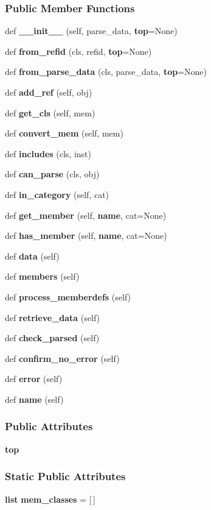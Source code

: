\subsubsection*{Public Member Functions}
\begin{DoxyCompactItemize}
\item 
def {\bf \+\_\+\+\_\+init\+\_\+\+\_\+} (self, parse\+\_\+data, {\bf top}=None)
\item 
def {\bf from\+\_\+refid} (cls, refid, {\bf top}=None)
\item 
def {\bf from\+\_\+parse\+\_\+data} (cls, parse\+\_\+data, {\bf top}=None)
\item 
def {\bf add\+\_\+ref} (self, obj)
\item 
def {\bf get\+\_\+cls} (self, mem)
\item 
def {\bf convert\+\_\+mem} (self, mem)
\item 
def {\bf includes} (cls, inst)
\item 
def {\bf can\+\_\+parse} (cls, obj)
\item 
def {\bf in\+\_\+category} (self, cat)
\item 
def {\bf get\+\_\+member} (self, {\bf name}, cat=None)
\item 
def {\bf has\+\_\+member} (self, {\bf name}, cat=None)
\item 
def {\bf data} (self)
\item 
def {\bf members} (self)
\item 
def {\bf process\+\_\+memberdefs} (self)
\item 
def {\bf retrieve\+\_\+data} (self)
\item 
def {\bf check\+\_\+parsed} (self)
\item 
def {\bf confirm\+\_\+no\+\_\+error} (self)
\item 
def {\bf error} (self)
\item 
def {\bf name} (self)
\end{DoxyCompactItemize}
\subsubsection*{Public Attributes}
\begin{DoxyCompactItemize}
\item 
{\bf top}
\end{DoxyCompactItemize}
\subsubsection*{Static Public Attributes}
\begin{DoxyCompactItemize}
\item 
{\bf list} {\bf mem\+\_\+classes} = [$\,$]
\end{DoxyCompactItemize}
